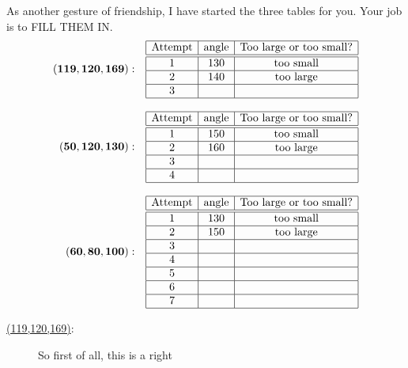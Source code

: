 \documentclass[noauthor,nooutcomes,handout,12pt]{ximera}
\begin{document}
\begin{question}
     As another gesture of friendship, I have started the three tables
     for you. Your job is to FILL THEM IN.
     \[
     \begin{array}{rl}
       \mathbf{(119,120,169):} &
        \begin{array}{|c|c|c|c|}\hline
       \text{Attempt} & \text{angle} & \text{Too large or too small?} \\ \hline\hline
       1 & 130 & \text{too small} \\ \hline
       2 & 140 & \text{too large}  \\ \hline
       3 &  &   \\ \hline
        \end{array} \\
        & \\
          \mathbf{(50,120,130):} & \begin{array}{|c|c|c|c|}\hline
            \text{Attempt} & \text{angle} & \text{Too large or too small?} \\ \hline\hline
            1 & 150 & \text{too small} \\ \hline
            2 & 160 & \text{too large}  \\ \hline
            3 &  &   \\ \hline
            4 &  &   \\ \hline
     \end{array} \\
     & \\
       \mathbf{(60,80,100):}  &
        \begin{array}{|c|c|c|c|}\hline
       \text{Attempt} & \text{angle} & \text{Too large or too small?} \\ \hline\hline
       1 & 130 & \text{too small} \\ \hline
       2 & 150 & \text{too large}  \\ \hline
       3 &  &   \\ \hline
       4 &  &   \\ \hline
       5 &  &   \\ \hline
       6 &  &   \\ \hline
       7 &  &   \\ \hline
        \end{array}
     \end{array}
     \]
     \begin{freeResponse}
       \begin{description}
       \item[\underline{(119,120,169)}:] So first of all, this is a right

\end{description}
\end{freeResponse}
\end{question}
\end{document}

